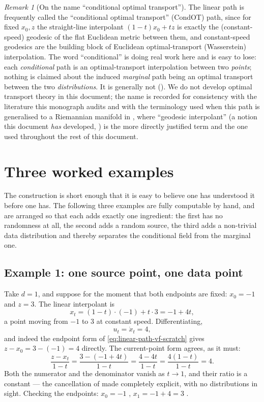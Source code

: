 \documentclass[11pt,a4paper]{report}
\theoremstyle{definition}
\theoremstyle{remark}
\newtheorem{remark}[remark]{Remark}
\begin{document}
\begin{remark}[On the name ``conditional optimal transport'']
\label{rem:cot-name}
The linear path is frequently called the ``conditional optimal transport''
(CondOT) path, since for fixed $x_0,z$ the straight-line interpolant
$(1-t)x_0+tz$ is exactly the (constant-speed) geodesic of the flat
Euclidean metric between them, and constant-speed geodesics are the
building block of Euclidean optimal-transport (Wasserstein) interpolation.
The word ``conditional'' is doing real work here and is easy to lose:
each \emph{conditional} path is an optimal-transport interpolation between
two \emph{points}; nothing is claimed about the induced \emph{marginal}
path being an optimal transport between the two \emph{distributions}. It
is generally not (). We do not develop optimal
transport theory in this document; the name is
recorded for consistency with the literature this monograph audits and
with the terminology used when this path is generalised to a Riemannian
manifold in , where ``geodesic interpolant''
(a notion this document \emph{has} developed, ) is the
more directly justified term and the one used throughout the rest of this
document.
\end{remark}

\section{Three worked examples}
\label{sec:fm-worked-examples}

The construction is short enough that it is easy to believe one has
understood it before one has. The following three examples are fully
computable by hand, and are arranged so that each adds exactly one
ingredient: the first has no randomness at all, the second adds a random
source, the third adds a non-trivial data distribution and thereby
separates the conditional field from the marginal one.

\subsection{Example 1: one source point, one data point}
\label{sec:fm-1d-deterministic}

Take $d=1$, and suppose for the moment that both endpoints are fixed:
$x_0=-1$ and $z=3$. The linear interpolant is
\[
x_t = (1-t)\cdot(-1) + t\cdot 3 = -1 + 4t ,
\]
a point moving from $-1$ to $3$ at constant speed. Differentiating,
\[
u_t = \dot x_t = 4 ,
\]
and indeed the endpoint form of \eqref{eq:linear-path-vf-scratch} gives
$z-x_0 = 3-(-1) = 4$ directly. The current-point form agrees, as it must:
\[
\frac{z-x_t}{1-t}
= \frac{3-(-1+4t)}{1-t}
= \frac{4-4t}{1-t}
= \frac{4(1-t)}{1-t}
= 4 .
\]
Both the numerator and the denominator vanish as $t\to1$, and their ratio
is a constant --- the cancellation of 
made completely explicit, with no distributions in sight. Checking the
endpoints: $x_0=-1$ \checkmark, $x_1 = -1+4 = 3$ \checkmark.
\end{document}
